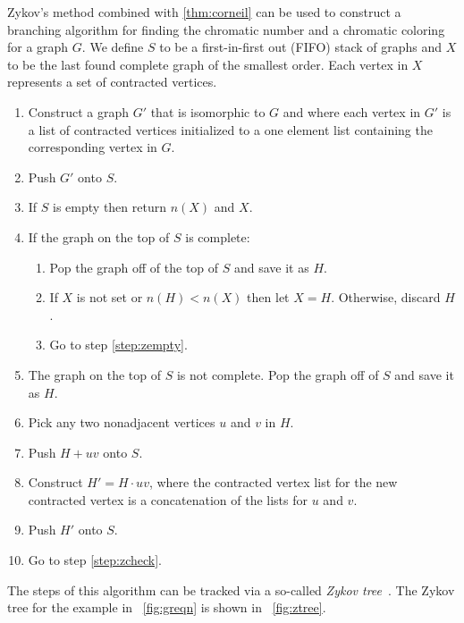 Zykov's method combined with \theoremname\ref{thm:corneil} can be used to construct a branching algorithm for
finding the chromatic number and a chromatic coloring for a graph \(G\).  We define \(S\) to be a first-in-first
out (FIFO) stack of graphs and \(X\) to be the last found complete graph of the smallest order.  Each vertex in
\(X\) represents a set of contracted vertices.
\begin{enumerate}
\item Construct a graph \(G'\) that is isomorphic to \(G\) and where each vertex in \(G'\) is a list of contracted
  vertices initialized to a one element list containing the corresponding vertex in \(G\).
\item Push \(G'\) onto \(S\).
\item \label{step:zempty} If \(S\) is empty then return \(n(X)\) and \(X\).
\item \label{step:zcheck} If the graph on the top of \(S\) is complete:
  \begin{enumerate}
  \item Pop the graph off of the top of \(S\) and save it as \(H\).
  \item If \(X\) is not set or \(n(H)<n(X)\) then let \(X=H\).  Otherwise, discard \(H\).
  \item Go to step \ref{step:zempty}.
  \end{enumerate}
\item The graph on the top of \(S\) is not complete.  Pop the graph off of \(S\) and save it as \(H\).
\item Pick any two nonadjacent vertices \(u\) and \(v\) in \(H\).
\item Push \(H+uv\) onto \(S\).
\item Construct \(H'=H\cdot uv\), where the contracted vertex list for the new contracted vertex is a concatenation
  of the lists for \(u\) and \(v\).
\item Push \(H'\) onto \(S\).
\item Go to step \ref{step:zcheck}.
\end{enumerate}

The steps of this algorithm can be tracked via a so-called \emph{Zykov tree}~\cite{corneil}.  The Zykov tree for
the example in \figurename~\ref{fig:greqn} is shown in \figurename~\ref{fig:ztree}.

